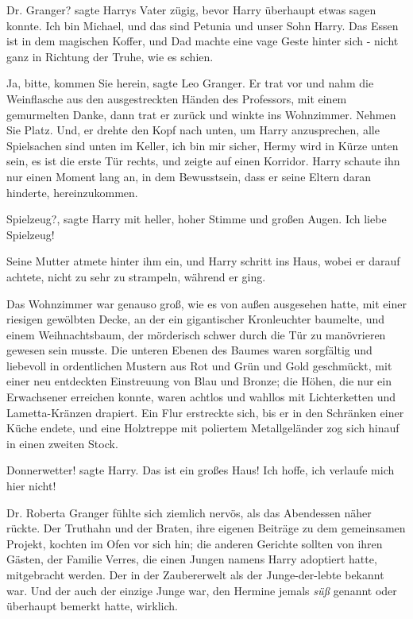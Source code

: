 \glqq{}Dr. Granger?\grqq{} sagte Harrys Vater zügig, bevor Harry überhaupt etwas
sagen konnte. \glqq{}Ich bin Michael, und das sind Petunia und unser Sohn Harry.
Das Essen ist in dem magischen Koffer\grqq{}, und Dad machte eine vage Geste
hinter sich - nicht ganz in Richtung der Truhe, wie es schien.

\glqq{}Ja, bitte, kommen Sie herein\grqq{}, sagte Leo Granger. Er trat vor und
nahm die Weinflasche aus den ausgestreckten Händen des Professors, mit einem
gemurmelten \glqq{}Danke\grqq{}, dann trat er zurück und winkte ins Wohnzimmer.
\glqq{}Nehmen Sie Platz. Und\grqq{}, er drehte den Kopf nach unten, um Harry
anzusprechen, \glqq{}alle Spielsachen sind unten im Keller, ich bin mir sicher,
Hermy wird in Kürze unten sein, es ist die erste Tür rechts\grqq{}, und zeigte
auf einen Korridor. Harry schaute ihn nur einen Moment lang an, in dem
Bewusstsein, dass er seine Eltern daran hinderte, hereinzukommen.

\glqq{}Spielzeug?\grqq{}, sagte Harry mit heller, hoher Stimme und großen Augen.
\glqq{}Ich liebe Spielzeug!\grqq{}

Seine Mutter atmete hinter ihm ein, und Harry schritt ins Haus, wobei er darauf
achtete, nicht zu sehr zu strampeln, während er ging.

Das Wohnzimmer war genauso groß, wie es von außen ausgesehen hatte, mit einer
riesigen gewölbten Decke, an der ein gigantischer Kronleuchter baumelte, und
einem Weihnachtsbaum, der mörderisch schwer durch die Tür zu manövrieren gewesen
sein musste. Die unteren Ebenen des Baumes waren sorgfältig und liebevoll in
ordentlichen Mustern aus Rot und Grün und Gold geschmückt, mit einer neu
entdeckten Einstreuung von Blau und Bronze; die Höhen, die nur ein Erwachsener
erreichen konnte, waren achtlos und wahllos mit Lichterketten und
Lametta-Kränzen drapiert. Ein Flur erstreckte sich, bis er in den Schränken
einer Küche endete, und eine Holztreppe mit poliertem Metallgeländer zog sich
hinauf in einen zweiten Stock.

\glqq{}Donnerwetter!\grqq{} sagte Harry. \glqq{}Das ist ein großes Haus! Ich
hoffe, ich verlaufe mich hier nicht!\grqq{}

Dr. Roberta Granger fühlte sich ziemlich nervös, als das Abendessen näher
rückte. Der Truthahn und der Braten, ihre eigenen Beiträge zu dem gemeinsamen
Projekt, kochten im Ofen vor sich hin; die anderen Gerichte sollten von ihren
Gästen, der Familie Verres, die einen Jungen namens Harry adoptiert hatte,
mitgebracht werden. Der in der Zaubererwelt als der Junge-der-lebte bekannt war.
Und der auch der einzige Junge war, den Hermine jemals \glqq{}\emph{süß}\grqq{}
genannt oder überhaupt bemerkt hatte, wirklich.

